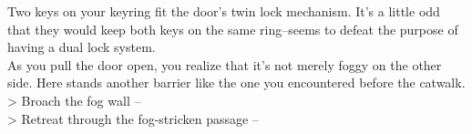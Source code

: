 Two keys on your keyring fit the door’s twin lock mechanism. It’s a little odd that they would keep both keys on the same ring--seems to defeat the purpose of having a dual lock system.\\

As you pull the door open, you realize that it’s not merely foggy on the other side. Here stands another barrier like the one you encountered before the catwalk.\\

> Broach the fog wall -- \\
> Retreat through the fog-stricken passage -- 